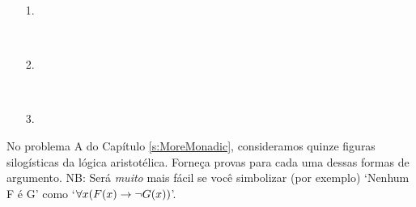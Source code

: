 \begin{itemize}
\item[1.] \begin{fitchproof}
	\open
	\close
{} {}
\end{fitchproof}

\item[] \

\item[2.] \begin{fitchproof}
 {}
 {}
\end{fitchproof}

\item[] \ 

\item[3.] \begin{fitchproof}
\open
\close
{}
\end{fitchproof}
\end{itemize}
 
\problempart
\label{pr.BarbaraEtc.proof1}
No problema A do Capítulo  \ref{s:MoreMonadic}, consideramos quinze figuras silogísticas da lógica aristotélica. Forneça provas para cada uma dessas formas de argumento. NB: Será \emph{muito} mais fácil se você simbolizar (por exemplo) `Nenhum F é G' como `$\forall x (\mathord{F}(x) \rightarrow \neg \mathord{G}(x))$'.

